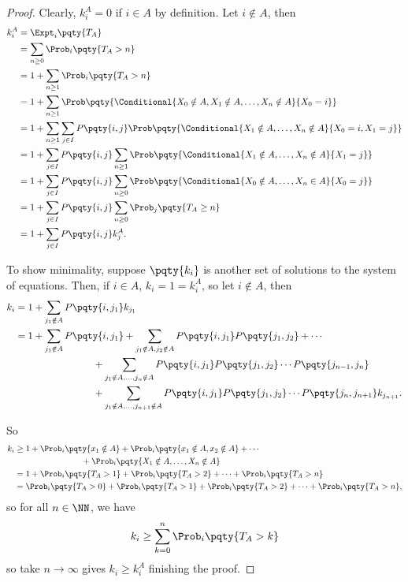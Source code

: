 \begin{proof}
    Clearly, \(k_i^A = 0\) if \(i \in A\) by definition. Let \(i \notin A\), then
    \begin{align*}
        k_i^A &= \Expt_i \pqty{T_A} \\
        &= \sum_{n \geq 0} \Prob_i \pqty{T_A > n} \\
        &= 1 + \sum_{n \geq 1} \Prob_i\pqty{T_A > n} \\
        &= 1 + \sum_{n \geq 1} \Prob\pqty{\Conditional{X_0 \notin A, X_1 \notin A, \ldots, X_n \notin A}{X_0 = i}} \\
        &= 1 + \sum_{n \geq 1} \sum_{j \in I} P\pqty{i, j} \Prob\pqty{\Conditional{X_1 \notin A, \ldots, X_n \notin A}{X_0 = i, X_1 = j}} \\
        &= 1 + \sum_{j \in I} P\pqty{i, j} \sum_{n \geq 1} \Prob\pqty{\Conditional{X_1 \notin A, \ldots, X_n \notin A}{X_1 = j}} \\
        &= 1 + \sum_{j \in I} P\pqty{i, j} \sum_{n \geq 0} \Prob\pqty{\Conditional{X_0 \notin A, \ldots, X_n \in A}{X_0 = j}} \\
        &= 1 + \sum_{j \in I} P\pqty{i, j} \sum_{n \geq 0} \Prob_j \pqty{T_A \geq n} \\
        &= 1 + \sum_{j \in I} P\pqty{i, j} k_j^A.
    \end{align*}

    To show minimality, suppose \(\pqty{k_i}\) is another set of solutions to the system of equations. Then, if \(i \in A\), \(k_i = 1 = k_i^A\), so let \(i \notin A\), then
    \begin{align*}
        k_i &= 1 + \sum_{j_1 \notin A} P \pqty{i, j_1} k_{j_1} \\
        &= 1 + \sum_{j_1 \notin A} P \pqty{i, j_1} + \sum_{j_1 \notin A, j_2 \notin A} P\pqty{i, j_1} P\pqty{j_1, j_2} + \cdots \\
        &\hspace{8em} + \sum_{j_1 \notin A, \ldots, j_n \notin A} P\pqty{i, j_1} P\pqty{j_1, j_2} \cdots P\pqty{j_{n - 1}, j_n} \\
        &\hspace{8em} + \sum_{j_1 \notin A, \ldots, j_{n + 1} \notin A} P\pqty{i, j_1} P\pqty{j_1, j_2} \cdots P\pqty{j_n, j_{n + 1}} k_{j_{n + 1}}.
    \end{align*}

    So
    \begin{align*}
        k_i &\geq 1 + \Prob_i \pqty{x_1 \notin A} + \Prob_i \pqty{x_1 \notin A, x_2 \notin A} + \cdots \\
        &\hspace{8em} + \Prob_i \pqty{X_1 \notin A, \ldots, X_n \notin A} \\
        &= 1 + \Prob_i \pqty{T_A > 1} + \Prob_i \pqty{T_A > 2} + \cdots + \Prob_i \pqty{T_A > n} \\
        &= \Prob_i \pqty{T_A > 0} + \Prob_i \pqty{T_A > 1} + \Prob_i \pqty{T_A > 2} + \cdots + \Prob_i \pqty{T_A > n},
    \end{align*}
    so for all \(n \in \NN\), we have
    \[
        k_i \geq \sum_{k = 0}^{n} \Prob_i\pqty{T_A > k}
    \]
    so take \(n \to \infty\) gives \(k_i \geq k_i^A\) finishing the proof.
\end{proof}